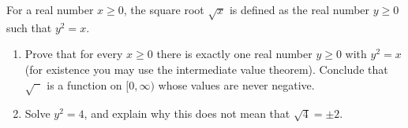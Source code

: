 For a real number $x\ge0$, the square root $\sqrt x$ is defined as the real number $y\ge0$ such that $y^2=x$.
\begin{enumerate}
\item[(a)] Prove that for every $x\ge0$ there is exactly one real number $y\ge0$ with $y^2=x$ (for existence you may use the intermediate value theorem). Conclude that $\sqrt{\phantom{x}}$ is a function on $[0,\infty)$ whose values are never negative.
\item[(b)] Solve $y^2=4$, and explain why this does not mean that $\sqrt4=\pm2$.
\end{enumerate}

